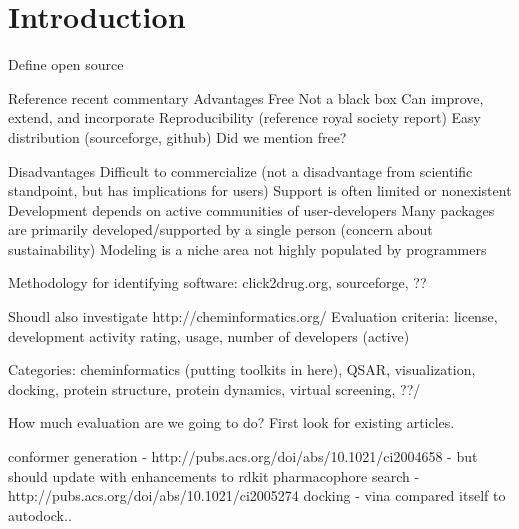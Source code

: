 \section*{Introduction}

Define open source

Reference recent commentary \cite{Karthikeyan_2014}\cite{Gezelter_2015}\cite{Krylov_2015}
Advantages 
Free
Not a black box 
Can improve, extend, and incorporate
Reproducibility (reference royal society report)
Easy distribution (sourceforge, github)
Did we mention free?

Disadvantages
Difficult to commercialize (not a disadvantage from scientific standpoint, but has implications for users)
Support is often limited or nonexistent 
Development depends on active communities of user-developers 
Many packages are primarily developed/supported by a single person (concern about sustainability)
Modeling is a niche area not highly populated by programmers

Methodology for identifying software: click2drug.org, sourceforge, ??

Shoudl also investigate http://cheminformatics.org/
Evaluation criteria: license, development activity rating, usage, number of developers (active)

Categories:
 cheminformatics (putting toolkits in here), QSAR, visualization, docking, protein structure, protein dynamics, virtual screening, ??/
 
 
 How much evaluation are we going to do?  First look for existing articles.
 
 conformer generation - http://pubs.acs.org/doi/abs/10.1021/ci2004658 - but should update with enhancements to rdkit
 pharmacophore search - http://pubs.acs.org/doi/abs/10.1021/ci2005274
 docking - vina compared itself to autodock..
  
  
  \cite{Koes_2011}
  